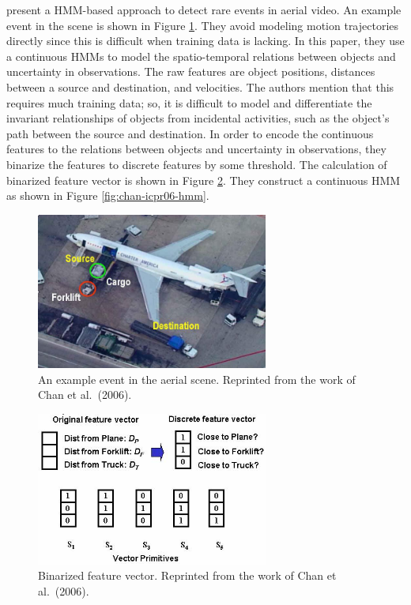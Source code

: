  present a HMM-based approach to 
detect rare events in aerial video. An example event in the scene is
shown in Figure \ref{fig:aerial-scene}. They avoid modeling motion
trajectories directly since this is difficult when training data is
lacking. In this paper, they use a continuous HMMs to model the
spatio-temporal relations between objects and uncertainty in
observations. The raw features are object positions, distances between
a source and destination, and velocities. The authors mention that
this requires much training data; so, it is difficult to model and
differentiate the invariant relationships of objects from incidental
activities, such as the object's path between the source and
destination. In order to encode the continuous features to the
relations between objects and uncertainty in observations, they
binarize the features to discrete features by some threshold. The
calculation of binarized feature vector is shown in
Figure \ref{fig:binarized-feature-vector}. They construct a continuous
HMM as shown in Figure \ref{fig:chan-icpr06-hmm}.

\begin{figure}[t]
  \begin{center}
    \includegraphics[width=3in]{figures/aerial-scene.jpg} \caption[An
      example event in the aerial scene]{An example event in the
      aerial scene. Reprinted from the work of Chan et al.\
      (2006).} 
    \label{fig:aerial-scene}
  \end{center}
\end{figure}

\begin{figure}[t]
  \begin{center}
    \includegraphics[width=3in]{figures/binarized-feature-vector.jpg}
    \caption[Binarized feature vector]{Binarized feature
    vector. Reprinted from the work of Chan et al.\
    (2006).} \label{fig:binarized-feature-vector}
  \end{center}
\end{figure}

